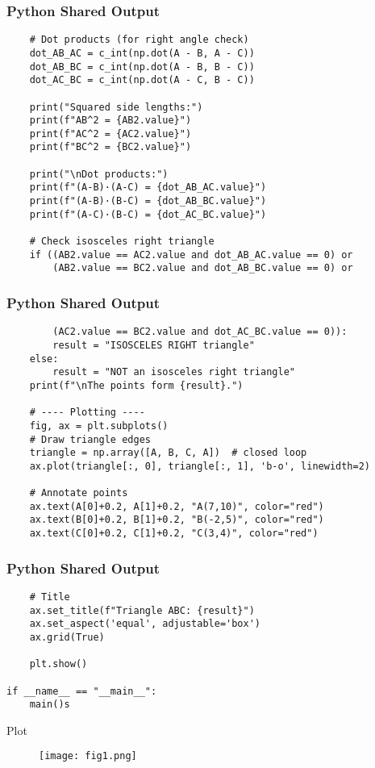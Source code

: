 \documentclass{beamer}
\begin{document}
 \begin{frame}[fragile]
		\frametitle{Python Shared Output}
		\begin{lstlisting}
    # Dot products (for right angle check)
    dot_AB_AC = c_int(np.dot(A - B, A - C))
    dot_AB_BC = c_int(np.dot(A - B, B - C))
    dot_AC_BC = c_int(np.dot(A - C, B - C))

    print("Squared side lengths:")
    print(f"AB^2 = {AB2.value}")
    print(f"AC^2 = {AC2.value}")
    print(f"BC^2 = {BC2.value}")

    print("\nDot products:")
    print(f"(A-B)·(A-C) = {dot_AB_AC.value}")
    print(f"(A-B)·(B-C) = {dot_AB_BC.value}")
    print(f"(A-C)·(B-C) = {dot_AC_BC.value}")

    # Check isosceles right triangle
    if ((AB2.value == AC2.value and dot_AB_AC.value == 0) or
        (AB2.value == BC2.value and dot_AB_BC.value == 0) or
          \end{lstlisting}
\end{frame}

 \begin{frame}[fragile]
		\frametitle{Python Shared Output}
		\begin{lstlisting}
        (AC2.value == BC2.value and dot_AC_BC.value == 0)):
        result = "ISOSCELES RIGHT triangle"
    else:
        result = "NOT an isosceles right triangle"
    print(f"\nThe points form {result}.")

    # ---- Plotting ----
    fig, ax = plt.subplots()
    # Draw triangle edges
    triangle = np.array([A, B, C, A])  # closed loop
    ax.plot(triangle[:, 0], triangle[:, 1], 'b-o', linewidth=2)

    # Annotate points
    ax.text(A[0]+0.2, A[1]+0.2, "A(7,10)", color="red")
    ax.text(B[0]+0.2, B[1]+0.2, "B(-2,5)", color="red")
    ax.text(C[0]+0.2, C[1]+0.2, "C(3,4)", color="red")
  \end{lstlisting}
\end{frame}

 \begin{frame}[fragile]
		\frametitle{Python Shared Output}
		\begin{lstlisting}
    # Title
    ax.set_title(f"Triangle ABC: {result}")
    ax.set_aspect('equal', adjustable='box')
    ax.grid(True)

    plt.show()

if __name__ == "__main__":
    main()s
        \end{lstlisting}
        \end{frame}
        \begin{frame}{Plot}
        \begin{figure}
            \centering
            \texttt{[image: fig1.png]}
            \caption{}
            \label{fig:placeholder}
        \end{figure}
        \end{frame}
\end{document}
